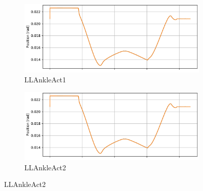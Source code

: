 \begin{figure}[h!]
\begin{subfigure}{.5\textwidth}
	\includegraphics[page=1, width=.95\linewidth]{experiments/balancing/ankleTrack}
	\caption{LLAnkleAct1}	
	\end{subfigure}%
\begin{subfigure}{.5\textwidth}
	\includegraphics[page=2, width=.95\linewidth]{experiments/balancing/ankleTrack}
	\caption{LLAnkleAct2}	
\end{subfigure}%


\end{figure}
